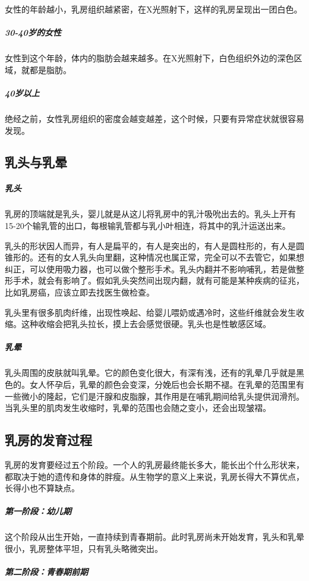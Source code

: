 \begin{enumerate}
女性的年龄越小，乳房组织越紧密，在X光照射下，这样的乳房呈现出一团白色。

\subparagraph{30-40岁的女性}

女性到这个年龄，体内的脂肪会越来越多。在X光照射下，白色组织外边的深色区域，就都是脂肪。

\subparagraph{40岁以上}

绝经之前，女性乳房组织的密度会越变越差，这个时候，只要有异常症状就很容易发现。

\subsection{乳头与乳晕}

\subparagraph{乳头}

乳房的顶端就是乳头，婴儿就是从这儿将乳房中的乳汁吸吮出去的。乳头上开有15-20个输乳管的出口，每根输乳管都与乳小叶相连，将其中的乳汁运送出来。

乳头的形状因人而异，有人是扁平的，有人是突出的，有人是圆柱形的，有人是圆锥形的。还有的女人乳头向里翻，这种情况也属正常，完全可以不去管它，如果想纠正，可以使用吸力器，也可以做个整形手术。乳头内翻并不影响哺乳，若是做整形手术，就会有影响了。假如乳头突然间出现内翻，就有可能是某种疾病的征兆，比如乳房癌，应该立即去找医生做检查。

乳头里有很多肌肉纤维，出现性唤起、给婴儿喂奶或遇冷时，这些纤维就会发生收缩。这种收缩会把乳头拉长，摸上去会感觉很硬。乳头也是性敏感区域。

\subparagraph{乳晕}

乳头周围的皮肤就叫乳晕。它的颜色变化很大，有深有浅，还有的乳晕几乎就是黑色的。女人怀孕后，乳晕的颜色会变深，分娩后也会长期不褪。在乳晕的范围里有一些微小的隆起，它们是汗腺和皮脂腺，其作用是在哺乳期间给乳头提供润滑剂。当乳头里的肌肉发生收缩时，乳晕的范围也会随之变小，还会出现皱褶。

\subsection{乳房的发育过程}

乳房的发育要经过五个阶段。一个人的乳房最终能长多大，能长出个什么形状来，都取决于她的遗传和身体的胖瘦。从生物学的意义上来说，乳房长得大不算优点，长得小也不算缺点。

\subparagraph{第一阶段：幼儿期}

这个阶段从出生开始，一直持续到青春期前。此时乳房尚未开始发育，乳头和乳晕很小，乳房整体平坦，只有乳头略微突出。

\subparagraph{第二阶段：青春期前期}


\end{enumerate}
